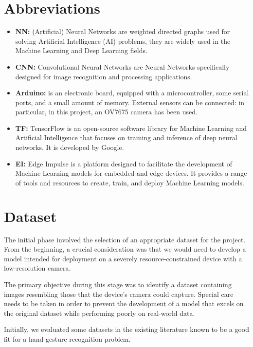 \documentclass{Configuration_Files/PoliMi3i_thesis}
\begin{document}
\chapter*{Abbreviations}
\label{ch:vocabulary}%
\begin{itemize}
    \item \textbf{NN:} (Artificial) Neural Networks are weighted directed graphs used for solving Artificial Intelligence (AI) problems, they are widely used in the Machine Learning and Deep Learning fields.
    \item \textbf{CNN: }Convolutional Neural Networks are Neural Networks specifically designed for image recognition and processing applications.
    \item \textbf{Arduino:} is an electronic board, equipped with a microcontroller, some serial ports, and a small amount of memory. External sensors can be connected: in particular, in this project, an OV7675 camera has been used.
    \item \textbf{TF:} TensorFlow \cite{tensorflow} is an open-source software library for Machine Learning and Artificial Intelligence that focuses on training and inference of deep neural networks. It is developed by Google.
    \item \textbf{EI:} Edge Impulse \cite{edge_impulse}  is a platform designed to facilitate the development of Machine Learning models for embedded and edge devices. It  provides a range of tools and resources to create, train, and deploy Machine Learning models.
\end{itemize}

\chapter{Dataset}
\label{ch:dataset}%
The initial phase involved the selection of an appropriate dataset for the project. From the beginning, a crucial consideration was that we would need to develop a model intended for deployment on a severely resource-constrained device with a low-resolution camera.

The primary objective during this stage was to identify a dataset containing images resembling those that the device's camera could capture. Special care needs to be taken in order to prevent the development of a model that excels on the original dataset while performing poorly on real-world data.

Initially, we evaluated some datasets in the existing literature known to be a good fit for a hand-gesture recognition problem. 
\end{document}
